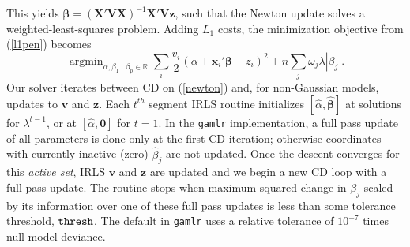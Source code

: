 \documentclass[12pt]{article}
\newcommand{\bs}[1]{\boldsymbol{#1}}
\newcommand{\mr}[1]{\mathrm{#1}}
\newcommand{\bm}[1]{\mathbf{#1}}
\newcommand{\ds}[1]{\mathds{#1}}
\DeclareMathOperator*{\argmin}{argmin}
\begin{document}
This yields $\bs{\beta} = (\bm{X}'\bm{V}\bm{X})^{-1}\bm{X}'\bm{V}\bm{z}$, such
that the Newton update solves a weighted-least-squares problem.   Adding $L_1$
costs,  the minimization objective from (\ref{l1pen}) becomes
\begin{equation} \label{newton}  \argmin_{\alpha,\beta_1 \ldots \beta_p \in
\ds{R}} \sum_i \frac{v_i}{2}(\alpha + \bm{x}_i'\bs{\beta} - z_i)^2  + n\sum_j \omega_j
\lambda |\beta_j|. \end{equation} Our solver iterates between CD on
(\ref{newton}) and,  for non-Gaussian models, updates to $\bm{v}$ and
$\bm{z}$. Each $t^{th}$ segment IRLS routine initializes $[\hat \alpha,
\bs{\hat \beta}]$ at solutions for $\lambda^{t-1}$, or at $[\hat \alpha,
\bm{0}]$ for $t=1$.  In the {\tt gamlr} implementation, a full pass update of
all parameters is done only at the first CD iteration; otherwise coordinates
with currently inactive (zero) $\hat\beta_j$ are not updated. Once the descent
converges for this {\it active set}, IRLS $\bm{v}$ and $\bm{z}$ are updated
and we begin a new CD loop with a full pass update.  The routine stops when
maximum squared change in $\beta_j$ scaled by its information over one of
these full pass updates is less than some tolerance threshold, ${\tt thresh}$.
The default in {\tt gamlr} uses a relative tolerance of $10^{-7}$ times null
model deviance.  

\vspace{.25cm}
\end{document}
